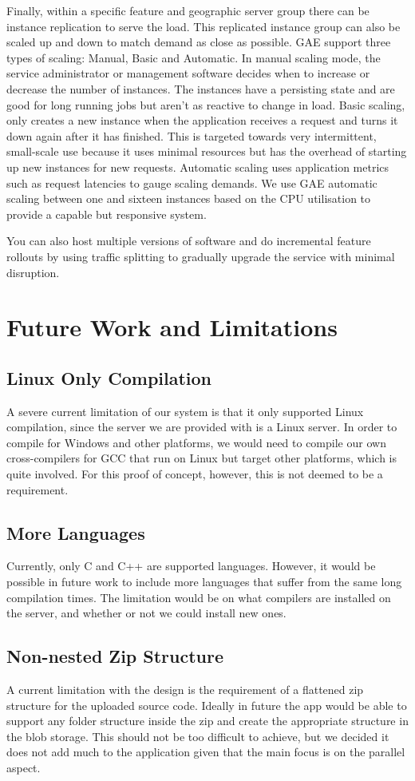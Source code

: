 \documentclass[conference]{IEEEtran}
\begin{document}
Finally, within a specific feature and geographic server group there can be
instance replication to serve the load. This replicated instance group can also
be scaled up and down to match demand as close as possible. GAE support three
types of scaling: Manual, Basic and Automatic. In manual scaling mode, the
service administrator or management software decides when to increase or
decrease the number of instances. The instances have a persisting state and are
good for long running jobs but aren't as reactive to change in load. Basic
scaling, only creates a new instance when the application receives a request and
turns it down again after it has finished. This is targeted towards very
intermittent, small-scale use because it uses minimal resources but has the
overhead of starting up new instances for new requests. Automatic scaling uses application metrics such as request latencies to gauge scaling demands. We use GAE automatic scaling between one and sixteen instances based on the CPU utilisation to provide a capable but responsive system.

You can also host multiple versions of software and do incremental feature rollouts by using traffic splitting to gradually upgrade the service with minimal disruption.

\section{Future Work and Limitations}
\subsection{Linux Only Compilation}
A severe current limitation of our system is that it only supported Linux
compilation, since the server we are provided with is a Linux server. In order
to compile for Windows and other platforms, we would need to compile our own
cross-compilers for GCC that run on Linux but target other platforms, which is
quite involved. For this proof of concept, however, this is not deemed to be a
requirement.
\subsection{More Languages}
Currently, only C and C++ are supported languages. However, it would be possible
in future work to include more languages that suffer from the same long
compilation times. The limitation would be on what compilers are installed on
the server, and whether or not we could install new ones.
\subsection{Non-nested Zip Structure}
A current limitation with the design is the requirement of a flattened zip
structure for the uploaded source code. Ideally in future the app would be able
to support any folder structure inside the zip and create the appropriate
structure in the blob storage. This should not be too difficult to achieve, but
we decided it does not add much to the application given that the main focus is
on the parallel aspect.
\end{document}

